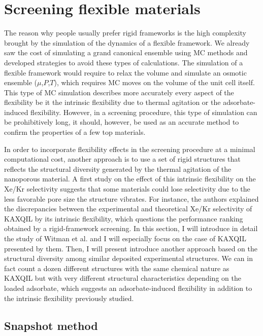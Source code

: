 \documentclass[main]{subfiles}
\begin{document}
\section{Screening flexible materials}

The reason why people usually prefer rigid frameworks is the high complexity brought by the simulation of the dynamics of a flexible framework. We already saw the cost of simulating a grand canonical ensemble using MC methods and developed strategies to avoid these types of calculations. The simulation of a flexible framework would require to relax the volume and simulate an osmotic ensemble ($\mu$,$P$,$T$), which requires MC moves on the volume of the unit cell itself.\autocite{Bousquet2012} This type of MC simulation describes more accurately every aspect of the flexibility be it the intrinsic flexibility due to thermal agitation or the adsorbate-induced flexibility. However, in a screening procedure, this type of simulation can be prohibitively long, it should, however, be used as an accurate method to confirm the properties of a few top materials. 

In order to incorporate flexibility effects in the screening procedure at a minimal computational cost, another approach is to use a set of rigid structures that reflects the structural diversity generated by the thermal agitation of the nanoporous material. A first study on the effect of this intrinsic flexibility on the Xe/Kr selectivity suggests that some materials could lose selectivity due to the less favorable pore size the structure vibrates.\autocite{Witman_2017} For instance, the authors explained the discrepancies between the experimental and theoretical Xe/Kr selectivity of KAXQIL\autocite{KAXQIL} by its intrinsic flexibility, which questions the performance ranking obtained by a rigid-framework screening. In this section, I will introduce in detail the study of Witman et al.\autocite{Witman_2017} and I will especially focus on the case of KAXQIL presented by them. Then, I will present introduce another approach based on the structural diversity among similar deposited experimental structures. We can in fact count a dozen different structures with the same chemical nature as KAXQIL but with very different structural characteristics depending on the loaded adsorbate, which suggests an adsorbate-induced flexibility in addition to the intrinsic flexibility previously studied. 

\subsection{Snapshot method}
\end{document}
